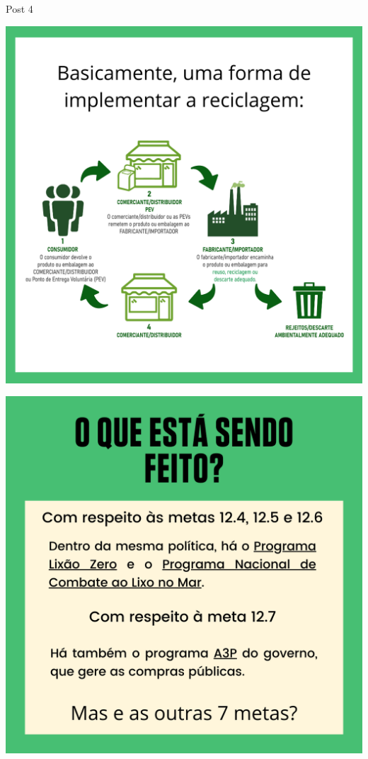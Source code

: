 \documentclass{beamer}
\begin{document}
	\begin{frame}{Post 4}
		\begin{minipage}{0.49\linewidth}
			\centering
			\includegraphics[width=\linewidth]{Post 4/3.png}
		\end{minipage}
		\hfill
		\begin{minipage}{0.49\linewidth}
			\centering
			\includegraphics[width=\linewidth]{Post 4/4.png}
		\end{minipage}
	\end{frame}
	
\end{document}
